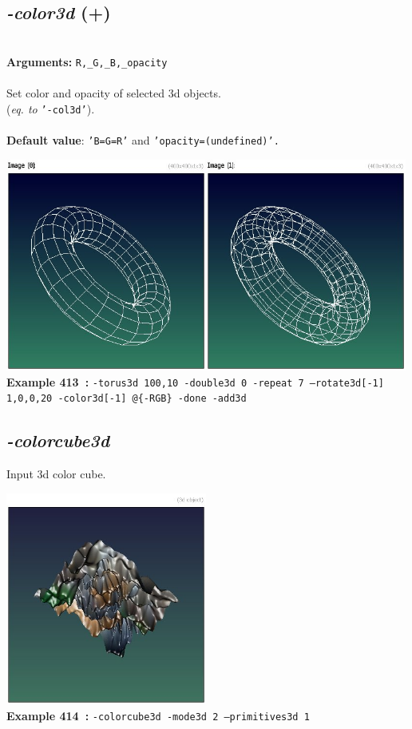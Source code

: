 \documentclass[a4paper,11pt,twoside]{book}
\begin{document}
\subsection{\emph{-color3d} (+)}\vspace*{-0.5em}
~\\\textbf{Arguments: } 
{\small \texttt{R,\_G,\_B,\_opacity}}\\~\\
Set color and opacity of selected 3d objects.
~\\(\emph{eq. to} {\small \texttt{'-col3d'}}).
~\\~\\\textbf{Default value}: {\small \texttt{'B=G=R'} and \texttt{'opacity=(undefined)'.}}
\begin{center}\includegraphics[keepaspectratio=true,height=7cm,width=\textwidth]{img/gmic_def413.jpg}\\
{\footnotesize \textbf{Example 413~:} \texttt{-torus3d 100,10 -double3d 0 -repeat 7 --rotate3d[-1] 1,0,0,20 -color3d[-1] @\{-RGB\} -done -add3d}}
\end{center}

\subsection{\emph{-colorcube3d} }\vspace*{-0.5em}
Input 3d color cube.
\begin{center}\includegraphics[keepaspectratio=true,height=7cm,width=\textwidth]{img/gmic_def414.jpg}\\
{\footnotesize \textbf{Example 414~:} \texttt{-colorcube3d -mode3d 2 --primitives3d 1}}
\end{center}
\end{document}
